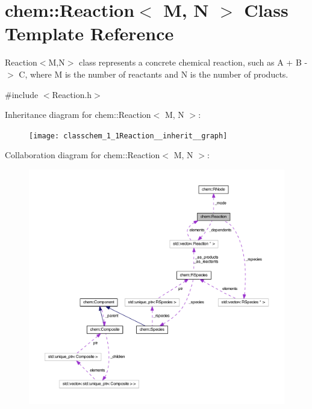 \hypertarget{classchem_1_1Reaction}{\section{chem\-:\-:Reaction$<$ M, N $>$ Class Template Reference}
\label{classchem_1_1Reaction}
}


Reaction$<$\-M,\-N$>$ class represents a concrete chemical reaction, such as A + B -\/$>$ C, where M is the number of reactants and N is the number of products.  




{\ttfamily \#include $<$Reaction.\-h$>$}



Inheritance diagram for chem\-:\-:Reaction$<$ M, N $>$\-:
\nopagebreak
\begin{figure}[H]
\begin{center}
\leavevmode
\texttt{[image: classchem\_1\_1Reaction\_\_inherit\_\_graph]}
\end{center}
\end{figure}


Collaboration diagram for chem\-:\-:Reaction$<$ M, N $>$\-:
\nopagebreak
\begin{figure}[H]
\begin{center}
\leavevmode
\includegraphics[width=350pt]{classchem_1_1Reaction__coll__graph}
\end{center}
\end{figure}

